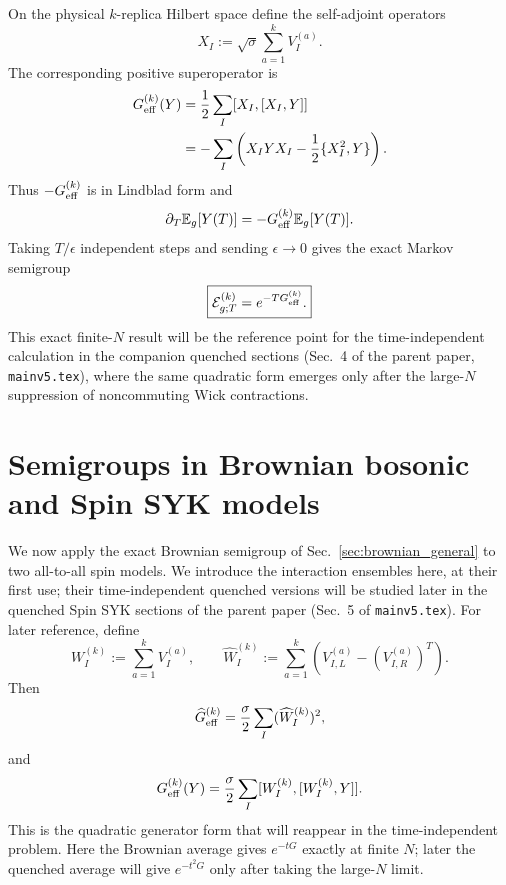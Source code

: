 \documentclass{article}
\theoremstyle{definition}
\begin{document}
On the physical $k$-replica Hilbert space define the self-adjoint operators
\begin{equation}
    X_I:=\sqrt\sigma\sum_{a=1}^kV_I^{(a)}.
\end{equation}
The corresponding positive superoperator is
\begin{align}
    G_{\rm eff}^{(k)}(Y)
    &=\frac12\sum_I[X_I,[X_I,Y]]
    \nonumber\\
    &=-\sum_I
      \left(X_IYX_I-\frac12\{X_I^2,Y\}\right).
    \label{eq:brownian_general_G}
\end{align}
Thus $-G_{\rm eff}^{(k)}$ is in Lindblad form and
\begin{equation}
    \partial_T\mathbb E_g[Y(T)]
    =-G_{\rm eff}^{(k)}\mathbb E_g[Y(T)].
\end{equation}
Taking $T/\epsilon$ independent steps and sending $\epsilon\to0$ gives the
exact Markov semigroup
\begin{equation}
    \boxed{
    {\cal E}_{g;T}^{(k)}=e^{-TG_{\rm eff}^{(k)}}.
    }
    \label{eq:brownian_general_semigroup}
\end{equation}
This exact finite-$N$ result will be the reference point for the
time-independent calculation in the companion quenched sections (Sec.~4 of the parent paper, \texttt{mainv5.tex}), where the
same quadratic form emerges only after the large-$N$ suppression of
noncommuting Wick contractions.


\section{Semigroups in Brownian bosonic and Spin SYK models}
\label{sec:brownian_spin_syk}

We now apply the exact Brownian semigroup of
Sec.~\ref{sec:brownian_general} to two all-to-all spin models.  We introduce
the interaction ensembles here, at their first use; their time-independent
quenched versions will be studied later in
the quenched Spin SYK sections of the parent paper (Sec.~5 of \texttt{mainv5.tex}).  For later reference,
define
\begin{equation}
    W_I^{(k)}:=\sum_{a=1}^kV_I^{(a)},
    \qquad
    \widehat W_I^{(k)}
    :=\sum_{a=1}^k
      \left(V_{I,L}^{(a)}-(V_{I,R}^{(a)})^T\right).
\end{equation}
Then
\begin{equation}
    \widehat G_{\rm eff}^{(k)}
    =\frac{\sigma}{2}\sum_I(\widehat W_I^{(k)})^2,
\end{equation}
and
\begin{equation}
    G_{\rm eff}^{(k)}(Y)
    =\frac{\sigma}{2}\sum_I
      [W_I^{(k)},[W_I^{(k)},Y]].
\end{equation}
This is the quadratic generator form that will reappear in the time-independent
problem.  Here the Brownian average gives $e^{-t G}$ exactly at finite $N$;
later the quenched average will give $e^{-t^2G}$ only after taking the
large-$N$ limit.
\end{document}

